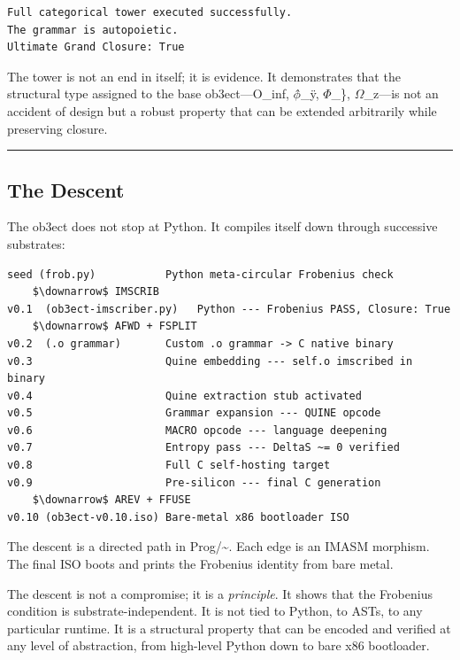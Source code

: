 \documentclass[12pt,a4paper]{article}
\begin{document}
\begin{lstlisting}
Full categorical tower executed successfully.
The grammar is autopoietic.
Ultimate Grand Closure: True
\end{lstlisting}

The tower is not an end in itself; it is evidence. It demonstrates that the structural type assigned to the base ob3ect---O\_inf, $\phi$̂\_ÿ, $\Phi$\_\}, $\Omega$\_z---is not an accident of design but a robust property that can be extended arbitrarily while preserving closure.

\begin{center}
\rule{0.5\textwidth}{0.4pt}
\end{center}

\subsection{The Descent}

The ob3ect does not stop at Python. It compiles itself down through successive substrates:

\begin{lstlisting}
seed (frob.py)           Python meta-circular Frobenius check
    $\downarrow$ IMSCRIB
v0.1  (ob3ect-imscriber.py)   Python --- Frobenius PASS, Closure: True
    $\downarrow$ AFWD + FSPLIT
v0.2  (.o grammar)       Custom .o grammar -> C native binary
v0.3                     Quine embedding --- self.o imscribed in binary
v0.4                     Quine extraction stub activated
v0.5                     Grammar expansion --- QUINE opcode
v0.6                     MACRO opcode --- language deepening
v0.7                     Entropy pass --- DeltaS ~= 0 verified
v0.8                     Full C self-hosting target
v0.9                     Pre-silicon --- final C generation
    $\downarrow$ AREV + FFUSE
v0.10 (ob3ect-v0.10.iso) Bare-metal x86 bootloader ISO
\end{lstlisting}

The descent is a directed path in Prog/\textasciitilde{}. Each edge is an IMASM morphism. The final ISO boots and prints the Frobenius identity from bare metal.

The descent is not a compromise; it is a \emph{principle}. It shows that the Frobenius condition is substrate-independent. It is not tied to Python, to ASTs, to any particular runtime. It is a structural property that can be encoded and verified at any level of abstraction, from high-level Python down to bare x86 bootloader.
\end{document}
